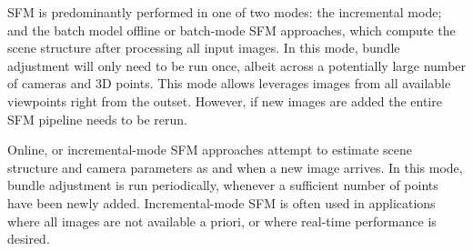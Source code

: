 SFM is predominantly performed in one of two modes: the incremental mode; and the batch model offline or batch-mode SFM approaches, which compute the scene structure after processing all input images. In this mode, bundle adjustment will only need to be run once, albeit across a potentially large number of cameras and 3D points. This mode allows leverages images from all available viewpoints right from the outset. However, if new images are added the entire SFM pipeline needs to be rerun.

Online, or incremental-mode SFM approaches attempt to estimate scene structure and camera parameters as and when a new image arrives. In this mode, bundle adjustment is run periodically, whenever a sufficient number of points have been newly added. Incremental-mode SFM is often used in applications where all images are not available a priori, or where real-time performance is desired.




